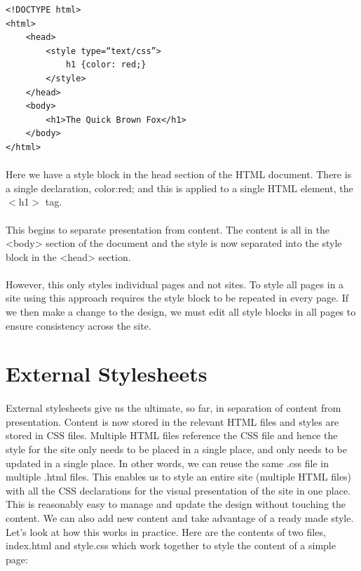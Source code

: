\begin{lstlisting}
<!DOCTYPE html>
<html>
	<head>
		<style type=“text/css”>
			h1 {color: red;}
		</style>
	</head>
	<body>
		<h1>The Quick Brown Fox</h1>
	</body>
</html>
\end{lstlisting}


\paragraph{} Here we have a style block in the head section of the HTML document. There is a single declaration, color:red; and this is applied to a single HTML element, the $<$h1$>$ tag.

\paragraph{} This begins to separate presentation from content. The content is all in the <body> section of the document and the style is now separated into the style block in the <head> section.

\paragraph{} However, this only styles individual pages and not sites. To style all pages in a site using this approach requires the style block to be repeated in every page. If we then make a change to the design, we must edit all style blocks in all pages to ensure consistency across the site.

\section{External Stylesheets}
\paragraph{} External stylesheets give us the ultimate, so far, in separation of content from presentation. Content is now stored in the relevant HTML files and styles are stored in CSS files. Multiple HTML files reference the CSS file and hence the style for the site only needs to be placed in a single place, and only needs to be updated in a single place. In other words, we can reuse the same .css file in multiple .html files. This enables us to style an entire site (multiple HTML files) with all the CSS declarations for the visual presentation of the site in one place. This is reasonably easy to manage and update the design without touching the content. We can also add new content and take advantage of a ready made style.  Let's look at how this works in practice. Here are the contents of two files, index.html and style.css which work together to style the content of a simple page:

